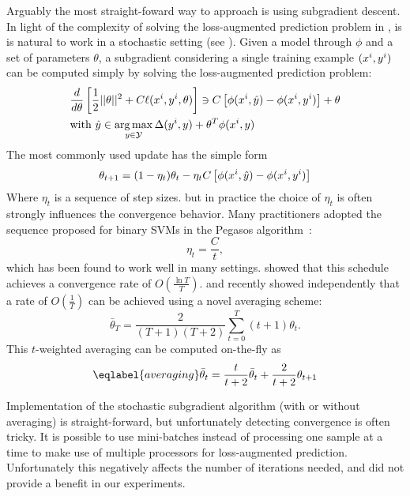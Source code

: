 Arguably the most straight-foward way to approach  is
using subgradient descent.  In light of the complexity of solving the
loss-augmented prediction problem in , is is natural
to work in a stochastic setting (see \citet{ratliff2007online}).
Given a model through $\phi$ and a set of parameters $\theta$, a subgradient
considering a single training example $(x^{i}, y^{i})$
can be computed simply by solving the loss-augmented prediction problem:
\begin{align}
    &\frac{d}{d\theta} \left [ \frac{1}{2} ||\theta||^2 + C \ell(x^{i}, y^{i}, \theta) \right ] \ni C\left [ \phi(x^{i}, \hat{y}) - \phi(x^{i}, y^{i}) \right]+ \theta\\
    &\text{with }\hat{y} \in \operatorname*{arg\,max}_{y \in \mathcal{Y}} \Delta(y^{i}, y) + \theta^T \phi(x^{i}, y)
\end{align}
The most commonly used update has the simple form
\begin{equation}
    \theta_{t+1} = (1 - \eta_t) \theta_t - \eta_t C \left [\phi(x^{i}, \hat{y}) - \phi(x^{i}, y^{i})\right]
\end{equation}
Where $\eta_t$ is a sequence of step sizes.
but in practice the choice of $\eta_t$ is often strongly influences the convergence behavior.
Many practitioners adopted the sequence proposed for binary SVMs in the Pegasos algorithm~\citep{shalev2011pegasos}:
\begin{equation}
    \eta_t = \frac{C}{t},
\end{equation}
which has been found to work well in many settings.
\citet{shalev2011pegasos} showed that this schedule achieves a convergence rate of $O(\frac{\ln T }{T})$.
\citet{lacoste2012block} and \citet{shamir2012stochastic} recently showed independently that
a rate of $O(\frac{1}{T})$ can be achieved using a novel averaging scheme:
\begin{equation}
    \bar{\theta}_{T} = \frac{2}{(T+1)(T+2)} \sum_{t=0}^T(t+1) \theta_t.
\end{equation}
This $t$-weighted averaging can be computed on-the-fly as
\begin{equation}\eqlabel{averaging}
    \bar{\theta}_{t} = \frac{t}{t + 2} \bar{\theta}_t + \frac{2}{t+2} \theta_{t+1}
\end{equation}

Implementation of the stochastic subgradient algorithm (with or without
averaging) is straight-forward, but unfortunately detecting convergence is
often tricky.
It is possible to use mini-batches instead of processing one sample at a time
to make use of multiple processors for loss-augmented prediction. Unfortunately
this negatively affects the number of iterations needed, and did not provide a
benefit in our experiments.

